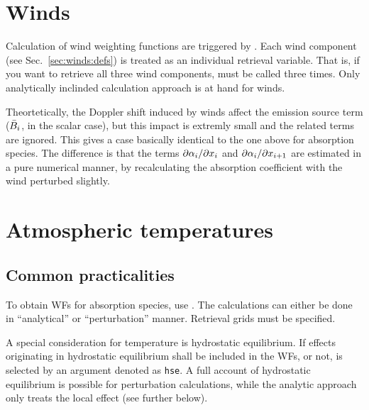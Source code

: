 \section{Winds}
\label{sec:wfuns:winds}
%
Calculation of wind weighting functions are triggered by
. Each wind component (see Sec.~\ref{sec:winds:defs})
is treated as an individual retrieval variable. That is, if you want to
retrieve all three wind components,  must be called
three times. Only analytically inclinded calculation approach is at hand for
winds.

Theortetically, the Doppler shift induced by winds affect the emission source
term ($\bar{B}_i$, in the scalar case), but this impact is extremly small
and the related terms are ignored. This gives a case basically identical to the
one above for absorption species. The difference is that the terms
$\partial{\alpha}_{i}/\partial x_{i}$ and
$\partial{\alpha}_{i}/\partial x_{i+1}$ are estimated in a pure numerical
manner, by recalculating the absorption coefficient with the wind perturbed
slightly.





\section{Atmospheric temperatures}
\label{sec:wfuns:atmtemp}

\subsection{Common practicalities}
%
To obtain WFs for absorption species, use .
The calculations can either be done in ``analytical'' or ``perturbation''
manner. Retrieval grids must be specified.

A special consideration for temperature is hydrostatic equilibrium. If effects
originating in hydrostatic equilibrium shall be included in the WFs, or
not, is selected by an argument denoted as \verb|hse|. A full account of
hydrostatic equilibrium is possible for perturbation calculations, while the
analytic approach only treats the local effect (see further below).



